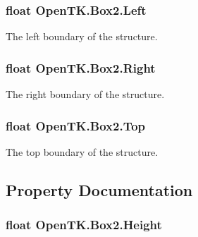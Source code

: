 \hypertarget{struct_open_t_k_1_1_box2_a51cc4c52d76b880d9671100b313695e9}{
\subsubsection[{Left}]{\setlength{\rightskip}{0pt plus 5cm}float Open\-T\-K.\-Box2.\-Left}}\label{struct_open_t_k_1_1_box2_a51cc4c52d76b880d9671100b313695e9}


The left boundary of the structure. 

\hypertarget{struct_open_t_k_1_1_box2_a74433a0faff0a2e3cfc378b9e38baf0f}{
\subsubsection[{Right}]{\setlength{\rightskip}{0pt plus 5cm}float Open\-T\-K.\-Box2.\-Right}}\label{struct_open_t_k_1_1_box2_a74433a0faff0a2e3cfc378b9e38baf0f}


The right boundary of the structure. 

\hypertarget{struct_open_t_k_1_1_box2_a1199b632ff542a034839df4033c6e91d}{
\subsubsection[{Top}]{\setlength{\rightskip}{0pt plus 5cm}float Open\-T\-K.\-Box2.\-Top}}\label{struct_open_t_k_1_1_box2_a1199b632ff542a034839df4033c6e91d}


The top boundary of the structure. 



\subsection{Property Documentation}
\hypertarget{struct_open_t_k_1_1_box2_a2b86d70da5b355bcd176649e325a535f}{
\subsubsection[{Height}]{\setlength{\rightskip}{0pt plus 5cm}float Open\-T\-K.\-Box2.\-Height\hspace{0.3cm}{\ttfamily [get]}}}\label{struct_open_t_k_1_1_box2_a2b86d70da5b355bcd176649e325a535f}


